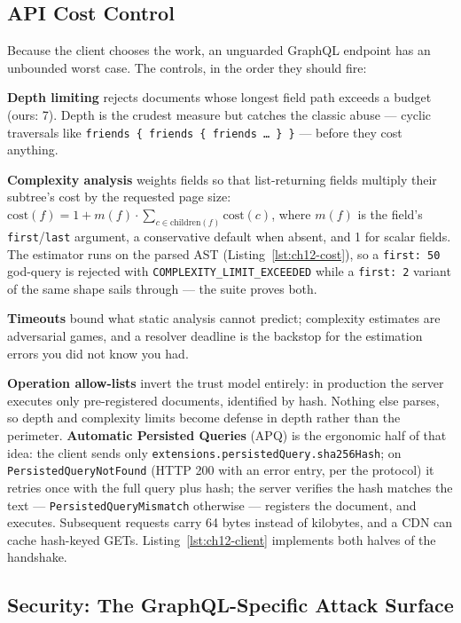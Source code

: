 \subsection{API Cost Control}
\label{sec:ch12-cost-control}

Because the client chooses the work, an unguarded GraphQL endpoint has an
unbounded worst case. The controls, in the order they should fire:

\textbf{Depth limiting} rejects documents whose longest field path exceeds
a budget (ours: 7). Depth is the crudest measure but catches the classic
abuse --- cyclic traversals like \texttt{friends \{ friends \{ friends
\ldots\ \} \}} --- before they cost anything.

\textbf{Complexity analysis} weights fields so that list-returning fields
multiply their subtree's cost by the requested page size:
$\mathrm{cost}(f) = 1 + m(f) \cdot \sum_{c \in \mathrm{children}(f)}
\mathrm{cost}(c)$, where $m(f)$ is the field's \texttt{first}/\texttt{last}
argument, a conservative default when absent, and 1 for scalar fields. The
estimator runs on the parsed AST (Listing~\ref{lst:ch12-cost}), so a
\texttt{first: 50} god-query is rejected with
\texttt{COMPLEXITY\_LIMIT\_EXCEEDED} while a \texttt{first: 2} variant of
the same shape sails through --- the suite proves both.

\textbf{Timeouts} bound what static analysis cannot predict; complexity
estimates are adversarial games, and a resolver deadline is the backstop
for the estimation errors you did not know you had.

\textbf{Operation allow-lists} invert the trust model entirely: in
production the server executes only pre-registered documents, identified
by hash. Nothing else parses, so depth and complexity limits become
defense in depth rather than the perimeter. \textbf{Automatic Persisted
Queries} (APQ) is the ergonomic half of that idea: the client sends only
\texttt{extensions.persistedQuery.sha256Hash}; on
\texttt{PersistedQueryNotFound} (HTTP 200 with an error entry, per the
protocol) it retries once with the full query plus hash; the server
verifies the hash matches the text --- \texttt{PersistedQueryMismatch}
otherwise --- registers the document, and executes. Subsequent requests
carry 64 bytes instead of kilobytes, and a CDN can cache hash-keyed GETs.
Listing~\ref{lst:ch12-client} implements both halves of the handshake.

\subsection{Security: The GraphQL-Specific Attack Surface}
\label{sec:ch12-security}

